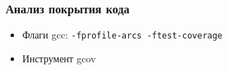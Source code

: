 \begin{frame}[fragile]
 \frametitle{Анализ покрытия кода}
 \begin{itemize}
   \item Флаги gcc: \verb+-fprofile-arcs -ftest-coverage+
   \item Инструмент gcov
 \end{itemize}
\end{frame}
